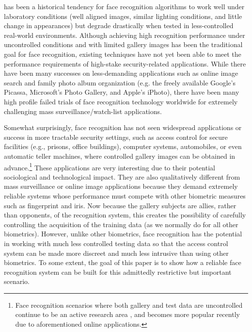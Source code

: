 \documentclass[12pt,journal,draftcls,letterpaper,onecolumn]{IEEEtran}
\begin{document}
 has been a historical tendency for face recognition algorithms to work well under laboratory conditions  (well aligned images, similar lighting conditions, and little change in appearances) but degrade drastically when tested in less-controlled real-world environments. Although achieving high recognition performance under uncontrolled conditions and with limited gallery images has been the traditional goal for face recognition, existing techniques have not yet been able to meet the performance requirements of high-stake security-related applications. While there have been many successes on less-demanding applications such as online image search and family photo album organization (e.g. the freely available Google's Picassa, Microsoft's Photo Gallery, and Apple's iPhoto), there have been many high profile failed trials of face recognition technology worldwide for extremely challenging mass surveillance/watch-list applications. 

Somewhat surprisingly, face recognition has not seen widespread applications or success in more tractable security settings, such as access control for secure facilities (e.g., prisons, office buildings), computer systems, automobiles, or even automatic teller machines,  where controlled gallery images can be obtained in advance.\footnote{Face recognition scenarios where both gallery and test data are uncontrolled continue to be an active research area \cite{LFW}, and becomes more popular recently due to aforementioned online applications.}  These applications are very interesting due to their potential sociological and technological impact.  They are also qualitatively different from mass surveillance or online image applications because they demand extremely reliable systems whose performance must compete with other biometric measures such as fingerprint and iris. Now because the gallery subjects are allies, rather than opponents, of the recognition system, this creates the possibility of carefully controlling the acquisition of the training data (as we normally do for all other biometrics). However, unlike other biometrics, face recognition has the potential in working with much less controlled testing data so that the access control system can be made more discreet and much less intrusive than using other biometrics. To some extent, the goal of this paper is to show how a reliable face recognition system can be built for this admittedly restrictive but important scenario. 
\end{document}
